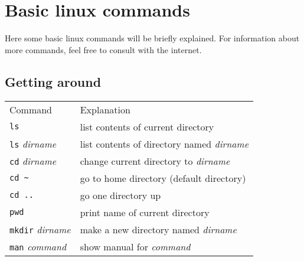 \section{Basic linux commands}
Here some basic linux commands will be briefly explained.
For information about more commands, feel free to consult with the internet.

\subsection{Getting around}
\begin{tabular}{ll}
  Command & Explanation \\
  \hhline{==}
  \texttt{ls} & list contents of current directory \\
  \texttt{ls} \textit{dirname} & list contents of directory named \textit{dirname} \\
  \texttt{cd} \textit{dirname} & change current directory to \textit{dirname} \\
  \texttt{cd \textasciitilde} & go to home directory (default directory) \\
  \texttt{cd ..} & go one directory up \\
  \texttt{pwd} & print name of current directory \\
  \texttt{mkdir} \textit{dirname} & make a new directory named \textit{dirname}\\
  \texttt{man} \textit{command} & show manual for \textit{command} \\
\end{tabular}

